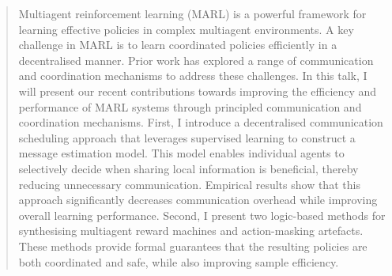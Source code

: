 \documentclass[runningheads,a4paper]{llncs}
\begin{document}
\begin{abstract}
Multiagent reinforcement learning (MARL) is a powerful framework for learning effective policies in complex multiagent environments. A key challenge in MARL is to learn coordinated policies efficiently in a decentralised manner. Prior work has explored a range of communication and coordination mechanisms to address these challenges. In this talk, I will present our recent contributions towards improving the efficiency and performance of MARL systems through principled communication and coordination mechanisms. First, I introduce a decentralised communication scheduling approach that leverages supervised learning to construct a message estimation model. This model enables individual agents to selectively decide when sharing local information is beneficial, thereby reducing unnecessary communication. Empirical results show that this approach significantly decreases communication overhead while improving overall learning performance. Second, I present two logic-based methods for synthesising multiagent reward machines and action-masking artefacts. These methods provide formal guarantees that the resulting policies are both coordinated and safe, while also improving sample efficiency. 
\end{abstract}
\end{document}
